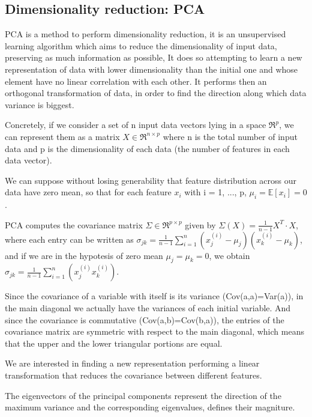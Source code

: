 \documentclass[a4paper,11pt]{article}
\begin{document}
\subsection{Dimensionality reduction: PCA}
PCA is a method to perform dimensionality reduction, it is an unsupervised learning algorithm which aims to reduce the dimensionality of input data, preserving as much information as possible,
It does so attempting to learn a new representation of data with lower dimensionality than the initial one and whose element have no linear correlation with each other. It performs then an orthogonal transformation of data, in order to find the direction along which data variance is biggest.

Concretely, if we consider a set of n input data vectors lying in a space $\Re^p$, we can represent them as a matrix $X \in \Re^{n \times p}$ where n is the total number of input data and p is the dimensionality of each data (the number of features in each data vector).

We can suppose without losing generability that feature distribution across our data have zero mean, so that for each feature $x_i$ with i = 1, ..., p, $\mu_i = \mathbb{E}[x_i]=0$.

PCA computes the covariance matrix $\Sigma \in \Re^{p \times p}$ given by $\Sigma(X) = \frac{1}{n-1} X^T \cdot X$, where each entry can be written as $\sigma_{jk} = \frac{1}{n-1}\sum_{i = 1}^n (x^{(i)}_j - \mu_j)(x^{(i)}_k - \mu_k)$, and if we are in the hypotesis of zero mean $\mu_j = \mu_k = 0$, we obtain $\sigma_{jk} = \frac{1}{n-1}\sum_{i = 1}^n (x^{(i)}_j x^{(i)}_k)$.

Since the covariance of a variable with itself is its variance (Cov(a,a)=Var(a)), in the main diagonal we actually have the variances of each initial variable. And since the covariance is commutative (Cov(a,b)=Cov(b,a)), the entries of the covariance matrix are symmetric with respect to the main diagonal, which means that the upper and the lower triangular portions are equal.

We are interested in finding a new representation performing a linear transformation that reduces the covariance between different features.

The eigenvectors of the principal components represent the direction of the maximum variance
and the corresponding eigenvalues, defines their magniture.
\end{document}
